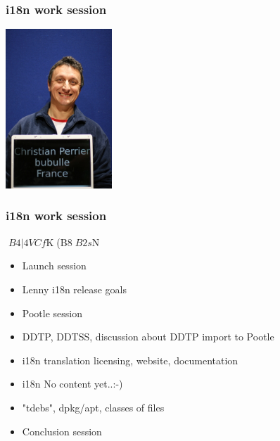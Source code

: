 \documentclass[cjk,dvipdfm,12pt]{beamer}
\begin{document}
\begin{frame}
\frametitle{i18n work session} 
  \begin{minipage}{0.4\hsize}
  \end{minipage}
  \begin{minipage}{0.4\hsize}
    \includegraphics[width=4cm]{image200707/bubulle.jpg}  
  \end{minipage}
\end{frame}

\begin{frame}
\frametitle{i18n work session} 
$B4|4VCf$K(B8$B2s$N%

  \begin{itemize}
     \item Launch session
     \item Lenny i18n release goals
     \item Pootle session
     \item DDTP, DDTSS, discussion about DDTP import to Pootle
     \item i18n  translation licensing, website, documentation
     \item i18n No content yet..:-)
     \item "tdebs", dpkg/apt, classes of files
     \item Conclusion session    
    
  \end{itemize}
\end{frame}
\end{document}
